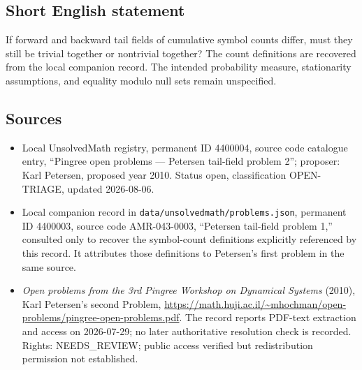 \documentclass[11pt]{article}
\begin{document}
\subsection{Short English statement}
If forward and backward tail fields of cumulative symbol counts differ, must they still be trivial together or nontrivial together? The count definitions are recovered from the local companion record. The intended probability measure, stationarity assumptions, and equality modulo null sets remain unspecified.
\subsection{Sources}
\begin{itemize}
\item Local UnsolvedMath registry, permanent ID 4400004, source code catalogue entry, ``Pingree open problems --- Petersen tail-field problem 2''; proposer: Karl Petersen, proposed year 2010. Status open, classification OPEN-TRIAGE, updated 2026-08-06.
\item Local companion record in \texttt{data/unsolvedmath/problems.json}, permanent ID 4400003, source code AMR-043-0003, ``Petersen tail-field problem 1,'' consulted only to recover the symbol-count definitions explicitly referenced by this record. It attributes those definitions to Petersen's first problem in the same source.
\item \emph{Open problems from the 3rd Pingree Workshop on Dynamical Systems} (2010), Karl Petersen's second Problem, \url{https://math.huji.ac.il/~mhochman/open-problems/pingree-open-problems.pdf}. The record reports PDF-text extraction and access on 2026-07-29; no later authoritative resolution check is recorded. Rights: NEEDS\_REVIEW; public access verified but redistribution permission not established.
\end{itemize}
\end{document}
